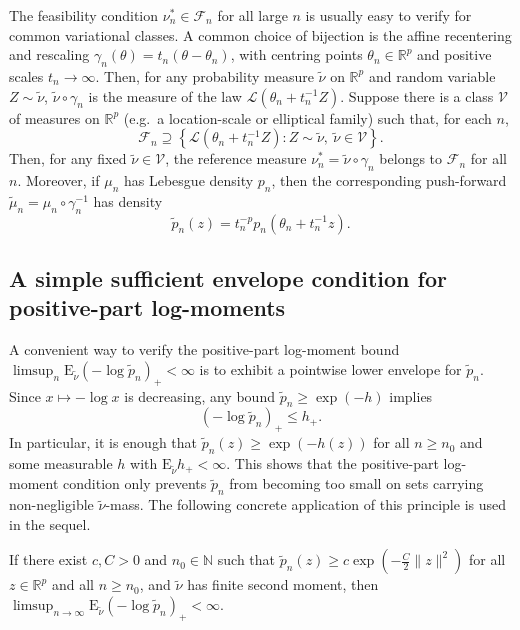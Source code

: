 \documentclass[11pt]{article}
\theoremstyle{plain}
\theoremstyle{definition}
\theoremstyle{remark}
\begin{document}
\begin{rem}
\label{rem:renyi-feasibility-location-scale} The feasibility condition
$\nu_{n}^{*}\in\mathcal{F}_{n}$ for all large $n$ is usually easy
to verify for common variational classes. A common choice of bijection
is the affine recentering and rescaling $\gamma_{n}(\theta)=t_{n}(\theta-\theta_{n})$,
with centring points $\theta_{n}\in\mathbb{R}^{p}$ and positive scales
$t_{n}\to\infty$. Then, for any probability measure $\tilde\nu$ on $\mathbb{R}^{p}$
and random variable $Z\sim \tilde\nu$, $\tilde\nu\circ\gamma_{n}$ is the measure of the law $\mathcal{L}(\theta_{n}+t_{n}^{-1}Z)$.
Suppose there is a class $\mathcal{V}$ of measures on $\mathbb{R}^{p}$
(e.g.\ a location-scale or elliptical family) such that, for each
$n$,
\[
\mathcal{F}_{n}\supseteq\left\{ \mathcal{L}\!\left(\theta_{n}+t_{n}^{-1}Z\right):Z\sim \tilde\nu,\ \tilde\nu\in\mathcal{V}\right\} .
\]
Then, for any fixed $\tilde\nu\in\mathcal{V}$, the reference measure $\nu_{n}^{*}=\tilde\nu\circ\gamma_{n}$
belongs to $\mathcal{F}_{n}$ for all $n$. Moreover, if $\mu_{n}$
has Lebesgue density $p_{n}$, then the corresponding push-forward
$\tilde\mu_n=\mu_{n}\circ\gamma_{n}^{-1}$ has density
\[
\tilde p_{n}(z)=t_{n}^{-p}p_{n}\!\left(\theta_{n}+t_{n}^{-1}z\right).
\]
\end{rem}

\subsection{A simple sufficient envelope condition for positive-part log-moments}


A convenient way to verify the positive-part log-moment bound $\limsup_{n}\mathrm{E}_{\tilde\nu}(-\log \tilde p_{n})_+<\infty$
is to exhibit a pointwise lower envelope for $\tilde p_{n}$. Since $x\mapsto-\log x$
is decreasing, any bound $\tilde p_{n} \geq \exp (-h)$ implies
\[
(-\log \tilde p_{n})_+\le h_+.
\]
In particular, it is enough that
$\tilde p_{n}(z)\ge\exp\left(-h(z)\right)$ for all $n\ge n_{0}$ and some measurable $h$ with $\mathrm{E}_{\tilde\nu}h_+<\infty$.
This shows that the positive-part log-moment condition only prevents $\tilde p_{n}$ from
becoming too small on sets carrying non-negligible $\tilde\nu$-mass. The
following concrete application of this principle is used in the sequel.



\begin{prop}
\label{prop:LAN-like} If there exist $c,C>0$ and $n_{0}\in\mathbb N$ such that $\tilde p_{n}(z)\ge c\exp\left(-\frac{C}{2}\|z\|^{2}\right)$
for all $z\in\mathbb{R}^{p}$ and all $n\ge n_0$, and $\tilde\nu$ has finite second moment,
then $\limsup_{n\to\infty}\mathrm{E}_{\tilde\nu}(-\log \tilde p_{n})_+<\infty$.
\end{prop}
\end{document}
